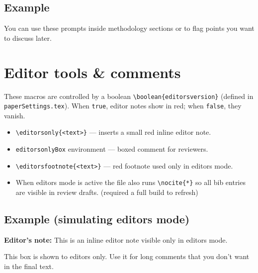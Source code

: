 \documentclass[nonacm, sigconf, balance=true]{acmart}
\begin{document}
    \subsection*{Example}

    \noindent You can use these prompts inside methodology sections or to flag points you want to discuss later.


    \newpage

    \section{Editor tools \& comments}
    These macros are controlled by a boolean \verb|\boolean{editorsversion}| (defined in \texttt{paperSettings.tex}). When \verb|true|, editor notes show in red; when \verb|false|, they vanish.

    \begin{itemize}
        \item \verb|\editorsonly{<text>}| — inserts a small red inline editor note.
        \item \verb|editorsonlyBox| environment — boxed comment for reviewers.
        \item \verb|\editorsfootnote{<text>}| — red footnote used only in editors mode.
        \item When editors mode is active the file also runs \verb|\nocite{*}| so all bib entries are visible in review drafts. (required a full build to refresh)
    \end{itemize}

    \subsection*{Example (simulating editors mode)}

    \par\vspace{0.05in}%
    {\footnotesize\noindent\textcolor{red!70!black}{\textbf{Editor's note:} This is an inline editor note visible only in editors mode.}}%
    \par\vspace{0.05in}%

    \par\medskip%
    \begin{tcolorbox}
        [%
        enhanced,
        breakable,
        colback=red!5,
        colframe=red!20!white,
        boxrule=0pt,
        borderline north={1pt}{0pt}{red!40!white},
        sharp corners,
        before skip=6pt,
        after skip=6pt,
        title={\textcolor{red!60!black}{\footnotesize Comment for editors:}},
        coltitle=red!70!black,
        fonttitle=\bfseries,
        top=2pt,
        bottom=2pt,
        left=4pt,
        right=4pt
        ]%
        This box is shown to editors only. Use it for long comments that you don't want in the final text. \\\\ \lorem
    \end{tcolorbox}%
\end{document}
